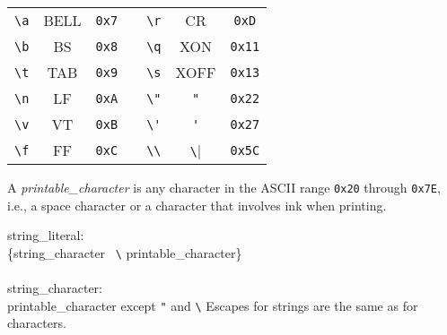 \begin{center}
\begin{tabular}{||c|c|c||c||c|c|c||}
\cline{1-3} \cline{5-7}
\verb|\a| & BELL & \verb|0x7| & \hspace{1.5in} & \verb|\r| & CR & \verb|0xD| \\
\cline{1-3} \cline{5-7}
\verb|\b| & BS   & \verb|0x8| &  & \verb|\q| & XON      & \verb|0x11| \\
\cline{1-3} \cline{5-7}
\verb|\t| & TAB  & \verb|0x9| &  & \verb|\s| & XOFF     & \verb|0x13| \\
\cline{1-3} \cline{5-7}
\verb|\n| & LF   & \verb|0xA| &  & \verb|\"| & \verb|"| & \verb|0x22| \\
\cline{1-3} \cline{5-7}
\verb|\v| & VT   & \verb|0xB| &  & \verb|\'| & \verb|'| & \verb|0x27| \\
\cline{1-3} \cline{5-7}
\verb|\f| & FF   & \verb|0xC| &  & \verb|\\| & \verb|\| & \verb|0x5C| \\
\cline{1-3} \cline{5-7}
\end{tabular}
\end{center}

A {\it{}printable\_character} is any character in the ASCII range
{\tt{}0x20} through {\tt{}0x7E}, i.e., a space character or a character that involves
ink when printing.

\grammarstart
string\_literal: \\
       \{string\_character \orbox \ \verb|\| printable\_character\} \\
 \\
string\_character: \\
      \>printable\_character except {\tt{}"} and \verb|\|
\grammarend
Escapes for strings are the same as for characters.



